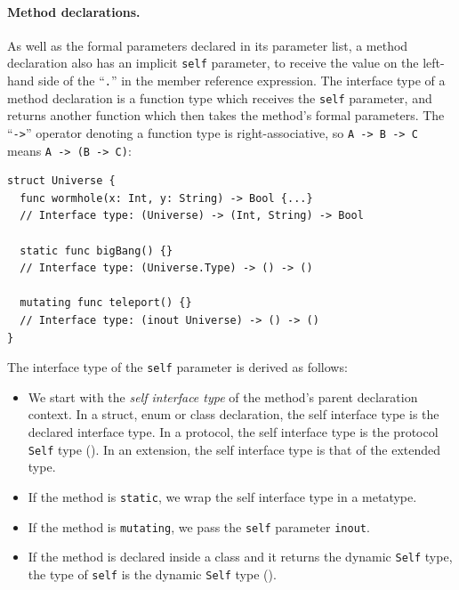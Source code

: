 \documentclass[../generics]{subfiles}
\begin{document}
\paragraph{Method declarations.}
As well as the formal parameters declared in its parameter list, a method declaration also has an implicit \texttt{self} parameter, to receive the value on the left-hand side of the ``\texttt{.}'' in the member reference expression. The interface type of a method declaration is a function type which receives the \texttt{self} parameter, and returns another function which then takes the method's formal parameters. The ``\texttt{->}'' operator denoting a function type is right-associative, so \verb|A -> B -> C| means \verb|A -> (B -> C)|:
\begin{Verbatim}
struct Universe {
  func wormhole(x: Int, y: String) -> Bool {...}
  // Interface type: (Universe) -> (Int, String) -> Bool

  static func bigBang() {}
  // Interface type: (Universe.Type) -> () -> ()

  mutating func teleport() {}
  // Interface type: (inout Universe) -> () -> ()
}
\end{Verbatim}
The interface type of the \texttt{self} parameter is derived as follows:
\begin{itemize}
\item We start with the \emph{self interface type} of the method's parent declaration context. In a struct, enum or class declaration, the self interface type is the declared interface type. In a protocol, the self interface type is the protocol \texttt{Self} type (). In an extension, the self interface type is that of the extended type.

\item If the method is \texttt{static}, we wrap the self interface type in a metatype.

\item If the method is \texttt{mutating}, we pass the \texttt{self} parameter \texttt{inout}.

\item If the method is declared inside a class and it returns the dynamic \texttt{Self} type, the type of \texttt{self} is the dynamic \texttt{Self} type ().
\end{itemize}
\end{document}
